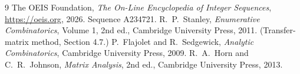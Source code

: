 \documentclass[11pt,a4paper]{article}
\theoremstyle{plain}
\theoremstyle{definition}
\begin{document}
\begin{thebibliography}{9}
 The OEIS Foundation, \emph{The On-Line Encyclopedia of Integer
Sequences}, \url{https://oeis.org}, 2026. Sequence A234721.
 R.~P.~Stanley, \emph{Enumerative Combinatorics}, Volume 1, 2nd ed.,
Cambridge University Press, 2011. (Transfer-matrix method, Section 4.7.)
 P.~Flajolet and R.~Sedgewick, \emph{Analytic Combinatorics}, Cambridge
University Press, 2009.
 R.~A.~Horn and C.~R.~Johnson, \emph{Matrix Analysis}, 2nd ed., Cambridge
University Press, 2013.
\end{thebibliography}
\end{document}

